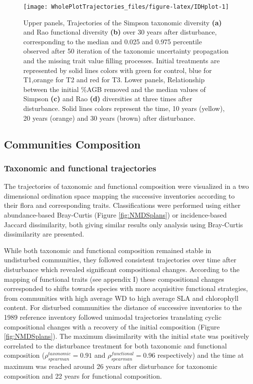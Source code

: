 \documentclass[fleqn,10pt]{ArtEcoFoG} %
\theoremstyle{definition}
\theoremstyle{definition}
\theoremstyle{definition}
\theoremstyle{remark}
\begin{document}
\begin{figure*}

{\centering \texttt{[image: WholePlotTrajectories\_files/figure-latex/IDHplot-1]} 

}

\caption{Upper panels, Trajectories of the Simpson taxonomic diversity \textbf{(a)} and Rao functional diversity \textbf{(b)} over 30 years after disturbance, corresponding to the median and 0.025 and 0.975 percentile observed after 50 iteration of the taxonomic uncertainty propagation and the missing trait value filling processes. Initial treatments are represented by solid lines colors with green for control, blue for T1,orange for T2 and red for T3. Lower panels, Relationship between the initial \%AGB removed and the median values of Simpson \textbf{(c)} and Rao \textbf{(d)} diversities at three times after disturbance. Solid lines colors represent the time, 10 years (yellow), 20 years (orange) and 30 years (brown) after disturbance.}\label{fig:IDHplot}
\end{figure*}

\subsection{Communities Composition}\label{communities-composition}

\subsubsection{Taxonomic and functional
trajectories}\label{taxonomic-and-functional-trajectories}

The trajectories of taxonomic and functional composition were visualized
in a two dimensional ordination space mapping the successive inventories
according to their flora and corresponding traits. Classifications were
performed using either abundance-based Bray-Curtis (Figure
\ref{fig:NMDSplans}) or incidence-based Jaccard dissimilarity, both
giving similar results only analysis using Bray-Curtis dissimilarity are
presented.

While both taxonomic and functional composition remained stable in
undisturbed communities, they followed consistent trajectories over time
after disturbance which revealed significant compositional changes.
According to the mapping of functional traits (see appendix I) these
compositional changes corresponded to shifts towards species with more
acquisitive functional strategies, from communities with high average WD
to high average SLA and chlorophyll content. For disturbed communities
the distance of successive inventories to the 1989 reference inventory
followed unimodal trajectories translating cyclic compositional changes
with a recovery of the initial composition (Figure \ref{fig:NMDSplans}).
The maximum dissimilarity with the initial state was positively
correlated to the disturbance treatment for both taxonomic and
functional composition (\(\rho_{spearman}^{taxonomic}=0.91\) and
\(\rho_{spearman}^{functional}=0.96\) respectively) and the time at
maximum was reached around 26 years after disturbance for taxonomic
composition and 22 years for functional composition.
\end{document}
